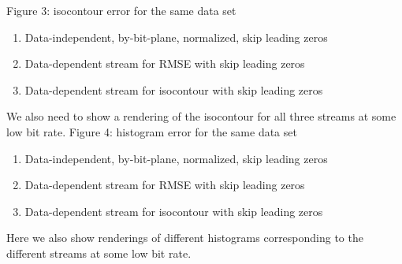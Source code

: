 \begin{enumerate}
  Figure 3: isocontour error for the same data set
    \begin{enumerate}
      \item Data-independent, by-bit-plane, normalized, skip leading zeros
      \item Data-dependent stream for RMSE with skip leading zeros
      \item Data-dependent stream for isocontour with skip leading zeros
    \end{enumerate}
  We also need to show a rendering of the isocontour for all three streams at some low bit rate.
  Figure 4: histogram error for the same data set
    \begin{enumerate}
      \item Data-independent, by-bit-plane, normalized, skip leading zeros
      \item Data-dependent stream for RMSE with skip leading zeros
      \item Data-dependent stream for isocontour with skip leading zeros
  \end{enumerate}  
  Here we also show renderings of different histograms corresponding to the different streams at some low bit rate.
\end{enumerate}
